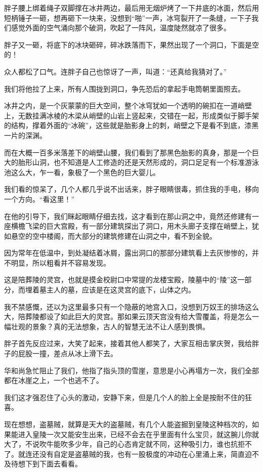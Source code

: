胖子腰上绑着绳子双脚撑在冰井两边，最后用无烟炉烤了一下井底的冰面，然后用短柄锤子一砸，想再砸下一块来，没想到“啪”一声，冰穹裂开了一条缝，一下子我们感觉外面的空气涌向那个破洞，吹起了一阵风，温度陡然就凉了很多。

胖子又一砸，将底下的冰块砸碎，碎冰跌落而下，果然出现了一个洞口，下面是空的！

众人都松了口气。连胖子自己也惊讶了一声，叫道：“还真给我猜对了。”

我们将他拉了上来，所有人围拢到洞口，争先恐后的拿起手电筒朝里面照去。

冰井之内，是一个灰蒙蒙的巨大空间，整个冰穹犹如一个透明的碗扣在一道峭壁上，无数挂满冰棱的木梁从峭壁的山岩上竖起来，交错在一起，形成类似于脚手架的结构，撑着外面的“冰碗”，这些就是胎影身上的刺，峭壁之下是看不到底，漆黑一片的深渊。

而在大概一百多米落差下的峭壁山腰，我们看到了那黑色胎影的真身，那是一个巨大的胎形山洞，也不知道是人工修造的还是天然形成的，洞口足足有一个标准游泳池这么大，乍一看，象极了一个黑色的巨大婴儿。

我们看的惊呆了，几个人都几乎说不出话来，胖子眼睛很毒，抓住我的手电，移向一个方向。“看这里！”

在他的引导下，我们眯起眼睛仔细去找，这才看到在那山洞之中，竟然还修建有一座横檐飞梁的巨大宫殿，有一部分建筑探出了洞口，用木头廊子支撑在峭壁上，犹如悬空的空中楼阁，而大部分的建筑修建在山洞之中，看不到全貌。

因为常年在低温中，到处凝结着冰屑，露出洞口的那部分建筑看上去灰惨惨的，并不明显，所以粗看并不容易发现。

这是陪葬陵的灵宫，也就是摸金校尉口中常提的龙楼宝殿，陵墓中的“陵”这一部分，而埋着墓主人的墓，应该是在这灵宫的底下，山体之内。

我不禁感慨，还以为这里最多只有一个隐蔽的地宫入口，没想到万奴王的排场这么大，陪葬陵都设了如此巨大的灵宫。那如果云顶天宫没有给大雪覆盖，将是怎么一幅壮观的景象？真的无法想象，古人的智慧无法不让人感到畏惧。

胖子首先反应过来，大笑了起来，接着其他人都笑了，大家互相击掌庆贺，我给胖子的屁股一撞，差点从冰上滑下去。

华和尚急忙阻止了我们，他指了指头顶的雪崖，意思是小心再塌方一次，我们全部都在冰崖之上，一个也逃不了。

我们这才强忍住了心头的激动，安静下来，但是几个人的脸上全是按耐不住的狂喜。

现在想想，盗墓贼，就算是天大的盗墓贼，有几个人能盗掘到皇陵这种档次的，如果能进入皇陵一次又能安生出来，已经不会去在乎里面有什么宝贝，就这腕儿你就大了，不说吹牛能吹多少年，自己的心态肯定就不同，这种吸引力，谁也抗拒不了。就连还没有自定是盗墓贼的我，也有一股极度的冲动在心里涌上来，简直迫不及待想下到下面去看看。

